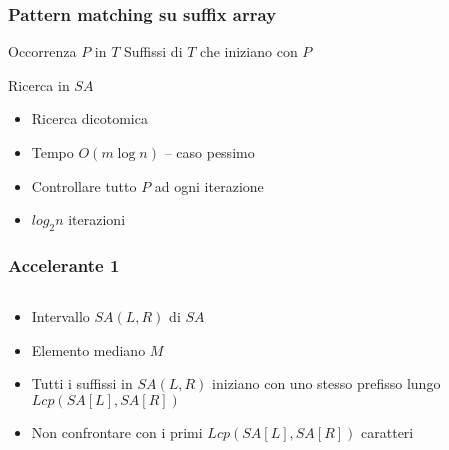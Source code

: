 
\usepackage{forloop}


\begin{frame}
	\titlepage
\end{frame}




\begin{frame}[fragile]
	\frametitle{Pattern matching su suffix array}
	\begin{block}{Occorrenza $P$ in $T$}
		Suffissi di $T$ che iniziano con $P$
	\end{block}
	\begin{block}{Ricerca in $SA$}
		\begin{itemize}
			\item
			      Ricerca dicotomica
			\item
			      Tempo $O(m \log n)$ -- caso pessimo
			\item
			      Controllare tutto $P$ ad ogni iterazione
			\item
			      $log_{2} n$ iterazioni
		\end{itemize}
	\end{block}
\end{frame}

\begin{frame}[fragile]
	\frametitle{Accelerante 1}
	\begin{columns}
		\begin{column}{0.6\textwidth}
			\begin{itemize}
				\item
				      Intervallo $SA(L, R)$ di $SA$
				\item
				      Elemento mediano $M$
				\item
				      Tutti i suffissi in $SA(L,R)$ iniziano con uno stesso prefisso lungo $Lcp(SA[L],
					      SA[R])$
				\item
				      Non confrontare con i primi $Lcp(SA[L], SA[R])$ caratteri
			\end{itemize}
		\end{column}
		\begin{column}{0.35\textwidth}
			\begin{center}
			\end{center}
		\end{column}
	\end{columns}
\end{frame}


